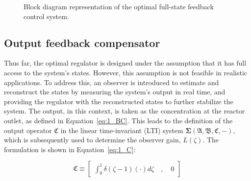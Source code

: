 \begin{figure}[!htbp]
    \centering
    \caption{Block diagram representation of the optimal full-state feedback control system.}
    \label{fig:1_block_diagram}
\end{figure}

\subsection{Output feedback compensator} \label{sec:1_output_design}

Thus far, the optimal regulator is designed under the assumption that it has full access to the system's states. However, this assumption is not feasible in realistic applications. To address this, an observer is introduced to estimate and reconstruct the states by measuring the system's output in real time, and providing the regulator with the reconstructed states to further stabilize the system. The output, in this context, is taken as the concentration at the reactor outlet, as defined in Equation~\ref{eq:1_BC}. This leads to the definition of the output operator $\mathfrak{C}$ in the linear time-invariant (LTI) system $\mathbf{\Sigma(\mathfrak{A},\mathfrak{B},\mathfrak{C},-)}$, which is subsequently used to determine the observer gain, ${L}(\zeta)$. The formulation is shown in Equation~\ref{eq:1_C}:

\begin{equation} \label{eq:1_C}
    \mathfrak{C} \equiv \begin{bmatrix}
        \int_0^1 \delta(\zeta-1) ( \cdot ) d\zeta \quad , \quad 0
    \end{bmatrix}
\end{equation}

